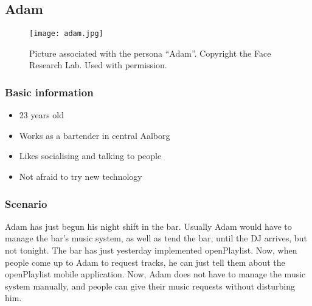 \subsection{Adam}
\begin{figure}[hbtp]
  \centering
  \texttt{[image: adam.jpg]}
  \caption[Persona \enquote{Adam}.]{Picture associated with the persona \enquote{Adam}. Copyright the Face Research Lab. Used with permission.}\label{fig:adam}
\end{figure}

\subsubsection{Basic information}
\begin{itemize}
\item 23 years old
\item Works as a bartender in central Aalborg
\item Likes socialising and talking to people
\item Not afraid to try new technology
\end{itemize}

\subsubsection{Scenario}
Adam has just begun his night shift in the bar. Usually Adam would have to manage the bar's music system, as well as tend the bar, until the DJ arrives, but not tonight. The bar has just yesterday implemented openPlaylist. Now, when people come up to Adam to request tracks, he can just tell them about the openPlaylist mobile application. Now, Adam does not have to manage the music system manually, and people can give their music requests without disturbing him.